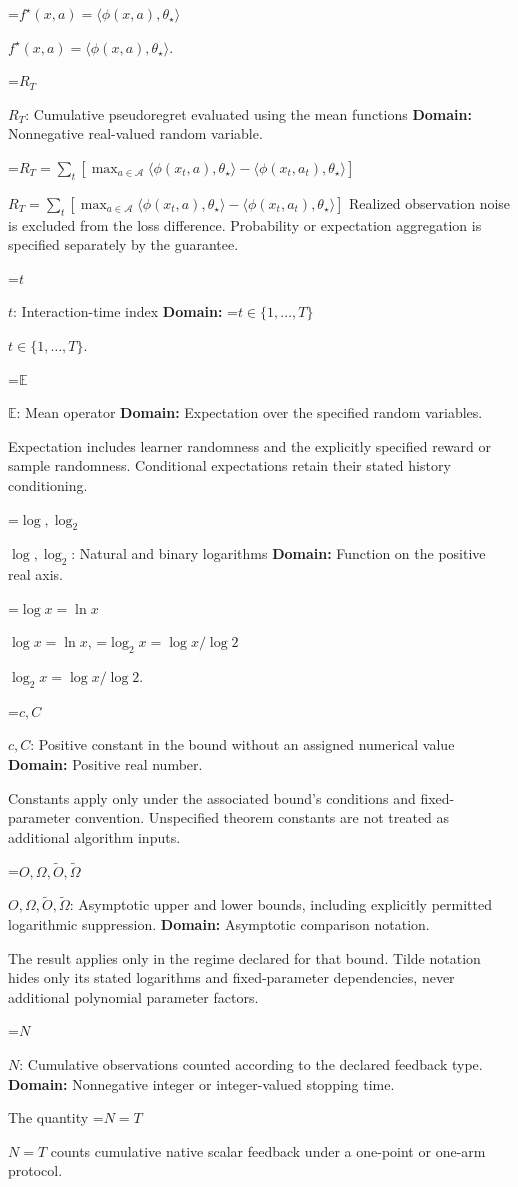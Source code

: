 \documentclass[10pt,a4paper]{article}
\newcommand{\AtlasMath}[1]{\par\begingroup\centering\setbox0=\hbox{$\displaystyle #1$}\ifdim\wd0>1.4\linewidth\typeout{ATLAS WIDE FORMULA: \the\wd0}\fi\ifdim\wd0>\linewidth\resizebox{\linewidth}{!}{\box0}\else\box0\fi\par\endgroup}
\newcommand{\AtlasInlineMath}[1]{\begingroup\setbox0=\hbox{$#1$}\ifdim\wd0>.4\linewidth\endgroup\AtlasMath{#1}\else\endgroup$#1$\fi}
\begin{document}
\AtlasInlineMath{f^\star(x,a)=\langle\phi(x,a),\theta_\star\rangle}.

\AtlasInlineMath{R_T}: Cumulative pseudoregret evaluated using the mean functions \textbf{Domain:} Nonnegative real-valued random variable.

\AtlasInlineMath{R_T=\sum_t[\max_{a\in\mathcal A}\langle\phi(x_t,a),\theta_\star\rangle-\langle\phi(x_t,a_t),\theta_\star\rangle]} Realized observation noise is excluded from the loss difference. Probability or expectation aggregation is specified separately by the guarantee.

\AtlasInlineMath{t}: Interaction-time index \textbf{Domain:} \AtlasInlineMath{t\in\{1,\ldots,T\}}.

\AtlasInlineMath{\mathbb E}: Mean operator \textbf{Domain:} Expectation over the specified random variables.

Expectation includes learner randomness and the explicitly specified reward or sample randomness. Conditional expectations retain their stated history conditioning.

\AtlasInlineMath{\log,\log_2}: Natural and binary logarithms \textbf{Domain:} Function on the positive real axis.

\AtlasInlineMath{\log x=\ln x}, \AtlasInlineMath{\log_2x=\log x/\log2}.

\AtlasInlineMath{c,C}: Positive constant in the bound without an assigned numerical value \textbf{Domain:} Positive real number.

Constants apply only under the associated bound’s conditions and fixed-parameter convention. Unspecified theorem constants are not treated as additional algorithm inputs.

\AtlasInlineMath{O,\Omega,\widetilde O,\widetilde\Omega}: Asymptotic upper and lower bounds, including explicitly permitted logarithmic suppression. \textbf{Domain:} Asymptotic comparison notation.

The result applies only in the regime declared for that bound. Tilde notation hides only its stated logarithms and fixed-parameter dependencies, never additional polynomial parameter factors.

\AtlasInlineMath{N}: Cumulative observations counted according to the declared feedback type. \textbf{Domain:} Nonnegative integer or integer-valued stopping time.

The quantity \AtlasInlineMath{N=T} counts cumulative native scalar feedback under a one-point or one-arm protocol.
\end{document}
